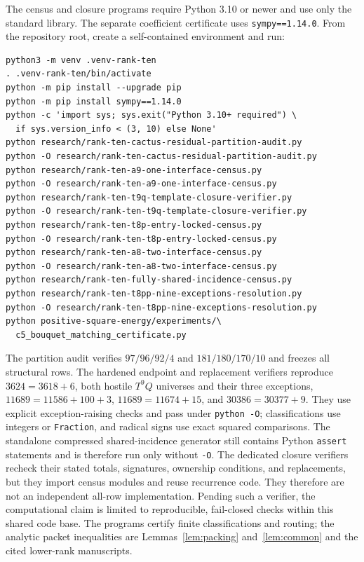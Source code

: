 \documentclass[11pt]{article}
\begin{document}
The census and closure programs require Python 3.10 or newer and use only the
standard library.  The separate coefficient certificate uses
\texttt{sympy==1.14.0}.  From the repository root, create a self-contained
environment and run:
\begin{verbatim}
python3 -m venv .venv-rank-ten
. .venv-rank-ten/bin/activate
python -m pip install --upgrade pip
python -m pip install sympy==1.14.0
python -c 'import sys; sys.exit("Python 3.10+ required") \
  if sys.version_info < (3, 10) else None'
python research/rank-ten-cactus-residual-partition-audit.py
python -O research/rank-ten-cactus-residual-partition-audit.py
python research/rank-ten-a9-one-interface-census.py
python -O research/rank-ten-a9-one-interface-census.py
python research/rank-ten-t9q-template-closure-verifier.py
python -O research/rank-ten-t9q-template-closure-verifier.py
python research/rank-ten-t8p-entry-locked-census.py
python -O research/rank-ten-t8p-entry-locked-census.py
python research/rank-ten-a8-two-interface-census.py
python -O research/rank-ten-a8-two-interface-census.py
python research/rank-ten-fully-shared-incidence-census.py
python research/rank-ten-t8pp-nine-exceptions-resolution.py
python -O research/rank-ten-t8pp-nine-exceptions-resolution.py
python positive-square-energy/experiments/\
  c5_bouquet_matching_certificate.py
\end{verbatim}
The partition audit verifies $97/96/92/4$ and $181/180/170/10$ and freezes all
structural rows.  The hardened endpoint and replacement verifiers reproduce
$3624=3618+6$, both hostile $T^9Q$ universes and their three exceptions,
$11689=11586+100+3$, $11689=11674+15$, and $30386=30377+9$.  They use explicit
exception-raising checks and pass under \texttt{python -O}; classifications use
integers or \texttt{Fraction}, and radical signs use exact squared comparisons.
The standalone compressed shared-incidence generator still contains Python
\texttt{assert} statements and is therefore run only without \texttt{-O}.
The dedicated closure verifiers recheck their stated totals, signatures,
ownership conditions, and replacements, but they import census modules and
reuse recurrence code.  They therefore are not an independent all-row
implementation.  Pending such a verifier, the computational claim is limited
to reproducible, fail-closed checks within this shared code base.  The programs
certify finite classifications and routing; the analytic packet inequalities
are Lemmas~\ref{lem:packing} and~\ref{lem:common} and the cited lower-rank
manuscripts.
\end{document}
